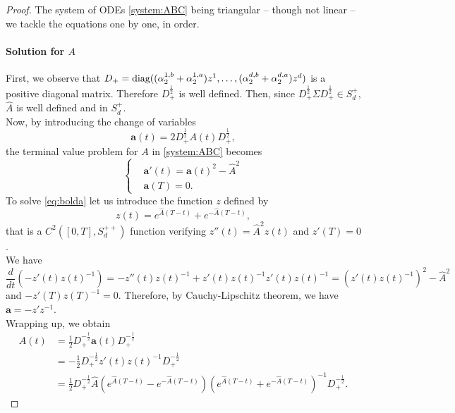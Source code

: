 \documentclass[preprint, 3p]{elsarticle}
\newcommand{\1}{{\chi}}
\begin{document}
\begin{proof}
The system of ODEs \eqref{system:ABC} being triangular -- though not linear -- we tackle the equations one by one, in order.\\

\paragraph{\textbf{Solution for $A$}}


First, we observe that $D_+ = \textup{diag}((\alpha^{1, b}_2 +
\alpha^{1, a}_2) z^1, \ldots, (\alpha^{d, b}_2 + \alpha^{d, a}_2) z^d)$ is a
positive diagonal matrix. Therefore $D_+^{\frac 12}$ is well defined. Then, since $D_+^{\frac 12} \Sigma D_+^{\frac 12} \in S_d^{+}$, $\widehat{A}$ is well defined and in $S_d^{+}$.\\

Now, by introducing the
change of variables
\[ \mathbf{a}(t) = 2 D_+^{\frac 12} A(t) D_+^{\frac 12}, \]
the terminal value problem for $A$ in \eqref{system:ABC} becomes
\begin{equation}\label{eq:bolda}
\begin{cases}
&\mathbf{a}'(t) = \mathbf{a}(t)^2 - \widehat{A}^2 \\
&\mathbf{a}(T) = 0.
\end{cases}
\end{equation}
To solve  \eqref{eq:bolda} let us introduce the function $z$ defined by
\[ z(t) = e^{\widehat{A}(T-t)} + e^{-\widehat{A}(T-t)}, \]
that is a $C^2([0,T], S_d^{++})$ function verifying $z''(t) = \widehat{A}^2 z(t)$ and $z'(T) = 0$.\\

We have
$$\frac{d}{dt}\left(-z'(t) z(t)^{-1}\right) = -z''(t) z(t)^{-1} + z'(t) z(t)^{-1}z'(t) z(t)^{-1} = \left(z'(t) z(t)^{-1}\right)^2 -\widehat{A}^2$$ and $-z'(T) z(T)^{-1} = 0$. Therefore, by Cauchy-Lipschitz theorem, we have $\mathbf{a} = -z'z^{-1}$.\\

Wrapping up, we obtain
\begin{align*}
A(t)
& = \frac{1}{2} D_+^{-\frac 12} \mathbf{a}(t) D_+^{-\frac 12} \\
& = -\frac{1}{2} D_+^{-\frac 12} z'(t) z(t)^{-1} D_+^{-\frac 12} \\
& = \frac{1}{2} D_+^{-\frac 12} \widehat{A}
    \left( e^{ \widehat{A} (T - t)} - e^{-\widehat{A} (T - t)} \right)
    \left( e^{ \widehat{A} (T - t)} + e^{-\widehat{A} (T - t)} \right)^{-1}
    D_+^{-\frac 12}.
\end{align*}


\end{proof}
\end{document}
